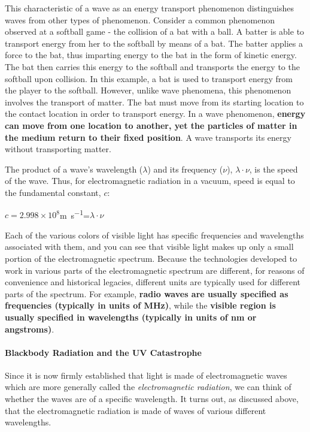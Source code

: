 \documentclass{article}
\begin{document}
{This characteristic of a wave as an energy transport phenomenon distinguishes waves from other types of phenomenon. Consider a common phenomenon observed at a softball game - the collision of a bat with a ball. A batter is able to transport energy from her to the softball by means of a bat. The batter applies a force to the bat, thus imparting energy to the bat in the form of kinetic energy. The bat then carries this energy to the softball and transports the energy to the softball upon collision. In this example, a bat is used to transport energy from the player to the softball. However, unlike wave phenomena, this phenomenon involves the transport of matter. The bat must move from its starting location to the contact location in order to transport energy. In a wave phenomenon, \textbf{energy can move from one location to another, yet the particles of matter in the medium return to their fixed position}. A wave transports its energy without transporting matter.

The product of a wave's wavelength ($\lambda$) and its frequency ($\nu$), $\lambda\cdot\nu$, is the speed of the wave. Thus, for electromagnetic radiation in a vacuum, speed is equal to the fundamental constant, $c$:

$c=2.998\times 10^8$\si{\metre\per\second}=$\lambda\cdot\nu$

Each of the various colors of visible light has specific frequencies and wavelengths associated with them, and you can see that visible light makes up only a small portion of the electromagnetic spectrum. Because the technologies developed to work in various parts of the electromagnetic spectrum are different, for reasons of convenience and historical legacies, different units are typically used for different parts of the spectrum. For example, \textbf{radio waves are usually specified as frequencies (typically in units of MHz)}, while the \textbf{visible region is usually specified in wavelengths (typically in units of nm or angstroms)}.

\paragraph{Blackbody Radiation and the UV Catastrophe}
Since it is now firmly established that light is made of electromagnetic waves which are more generally called the \emph{electromagnetic radiation}, we can think of whether the waves are of a specific wavelength. It turns out, as discussed above, that the electromagnetic radiation is made of waves of various different wavelengths. 

}
\end{document}
